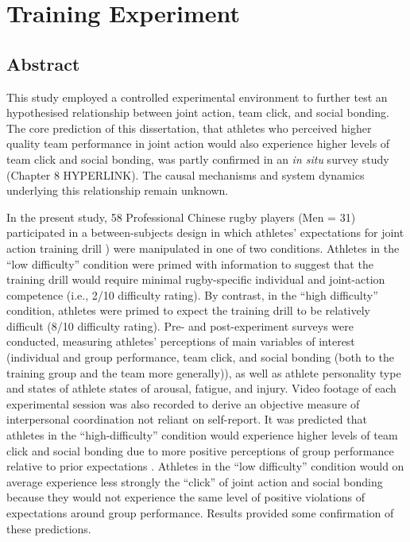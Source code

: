 \chapter{\label{9trainingExperiment}Training Experiment}

\minitoc


\section{Abstract}
This study employed a controlled experimental environment to further test an hypothesised relationship between joint action, team click, and social bonding.  The core prediction of this dissertation, that athletes who perceived higher quality team performance in joint action would also experience higher levels of team click and social bonding, was partly confirmed in an \textit{in situ} survey study (Chapter 8 HYPERLINK). The causal mechanisms and system dynamics underlying this relationship remain unknown.

In the present study, 58 Professional Chinese rugby players (Men = 31) participated in a between-subjects design in which athletes' expectations for joint action training drill \citep[``Invasion drill''][]{Passos2011}) were manipulated in one of two conditions.  Athletes in the ``low difficulty'' condition were primed with information to suggest that the training drill would require minimal rugby-specific individual and joint-action competence (i.e., 2/10 difficulty rating).  By contrast, in the ``high difficulty'' condition, athletes were primed to expect the training drill to be relatively difficult (8/10 difficulty rating). Pre- and post-experiment surveys were conducted, measuring athletes' perceptions of main variables of interest (individual and group performance, team click, and social bonding (both to the training group and the team more generally)), as well as athlete personality type and states of athlete states of arousal, fatigue, and injury.  Video footage of each experimental session was also recorded to derive an objective measure of interpersonal coordination not reliant on self-report. It was predicted that athletes in the ``high-difficulty'' condition would experience higher levels of team click and social bonding due to more positive perceptions of group performance relative to prior expectations .  Athletes in the ``low difficulty'' condition would on average experience less strongly the ``click'' of joint action and social bonding because they would not experience the same level of positive violations of expectations around group performance.  Results provided some confirmation of these predictions.

